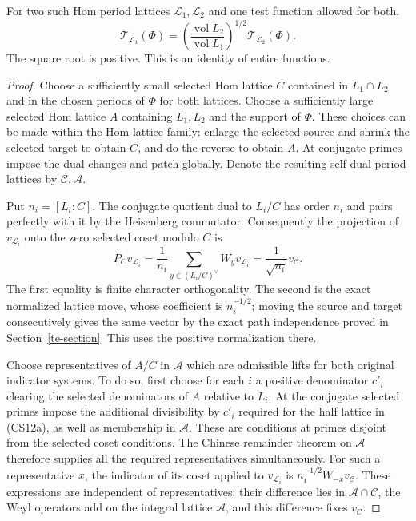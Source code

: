 \begin{lemma}\label{hec-common-theta}
For two such Hom period lattices $\mathcal L_1,\mathcal L_2$ and
one test function allowed for both,
\[
 \mathcal T_{\mathcal L_1}(\Phi)
   =\left(\frac{\operatorname{vol}L_2}
                  {\operatorname{vol}L_1}\right)^{1/2}
                                      \mathcal T_{\mathcal L_2}(\Phi).
 \tag{HC5}
\]
The square root is positive. This is an identity of entire functions.
\end{lemma}
\begin{proof}
Choose a sufficiently small selected Hom lattice $C$ contained in
$L_1\cap L_2$ and in the chosen periods of $\Phi$ for both lattices.
Choose a sufficiently
large selected Hom lattice $A$ containing $L_1,L_2$ and the support
of $\Phi$. These choices can be made within the Hom-lattice family:
enlarge the selected source and shrink the selected target to obtain
$C$, and do the reverse to obtain $A$. At conjugate primes impose
the dual changes and patch globally. Denote the resulting self-dual
period lattices by $\mathcal C,\mathcal A$.

Put $n_i=[L_i:C]$. The conjugate quotient dual to $L_i/C$ has order
$n_i$ and pairs perfectly with it by the Heisenberg commutator.
Consequently the projection of $v_{\mathcal L_i}$ onto the zero
selected coset modulo $C$ is
\[
 P_Cv_{\mathcal L_i}
       =\frac1{n_i}\sum_{y\in(L_i/C)^\vee}W_yv_{\mathcal L_i}
       =\frac1{\sqrt{n_i}}v_{\mathcal C}.
 \tag{HC6}
\]
The first equality is finite character orthogonality. The second is
the exact normalized lattice move, whose coefficient is
$n_i^{-1/2}$; moving the source and target consecutively gives the
same vector by the exact path independence proved in
Section~\ref{te-section}. This uses the positive normalization there.

Choose representatives of $A/C$ in $\mathcal A$ which are admissible
lifts for both original indicator systems. To do so, first choose
for each $i$ a positive denominator $c'_i$ clearing the selected
denominators of $A$ relative to $L_i$. At the conjugate selected
primes impose the additional divisibility by $c'_i$ required for
the half lattice in (CS12a), as well as membership in $\mathcal A$.
These are conditions at primes disjoint from the selected coset
conditions. The Chinese remainder theorem on $\mathcal A$ therefore
supplies all the required representatives simultaneously. For such a
representative $x$, the indicator of its coset applied to
$v_{\mathcal L_i}$ is
$n_i^{-1/2}W_{-x}v_{\mathcal C}$. These expressions are independent
of representatives: their difference lies in
$\mathcal A\cap\mathcal C$, the Weyl operators add on the integral
lattice $\mathcal A$, and this difference fixes $v_{\mathcal C}$.


\end{proof}
